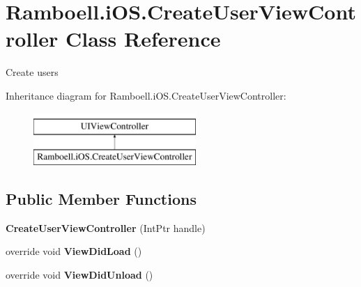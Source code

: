 \hypertarget{class_ramboell_1_1i_o_s_1_1_create_user_view_controller}{}\section{Ramboell.\+i\+O\+S.\+Create\+User\+View\+Controller Class Reference}
\label{class_ramboell_1_1i_o_s_1_1_create_user_view_controller}


Create users  


Inheritance diagram for Ramboell.\+i\+O\+S.\+Create\+User\+View\+Controller\+:\begin{figure}[H]
\begin{center}
\leavevmode
\includegraphics[height=2.000000cm]{class_ramboell_1_1i_o_s_1_1_create_user_view_controller}
\end{center}
\end{figure}
\subsection*{Public Member Functions}
\begin{DoxyCompactItemize}
\item 
\mbox{\label{class_ramboell_1_1i_o_s_1_1_create_user_view_controller_af749aeedd4bb661f67ab5f297a7c3d49}} 
{\bfseries Create\+User\+View\+Controller} (Int\+Ptr handle)
\item 
\mbox{\label{class_ramboell_1_1i_o_s_1_1_create_user_view_controller_a53e036ac7b3cd09c24835ba80d52b199}} 
override void {\bfseries View\+Did\+Load} ()
\item 
\mbox{\label{class_ramboell_1_1i_o_s_1_1_create_user_view_controller_a8abfc8e89410516cc428d838f308effb}} 
override void {\bfseries View\+Did\+Unload} ()
\end{DoxyCompactItemize}
